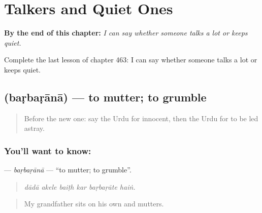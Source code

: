 
\chapter{Talkers and Quiet Ones}
\label{ch:ur-talkers-and-quiet-ones}

\begin{chapteropening}
\textbf{By the end of this chapter:} \emph{I can say whether someone talks a lot or keeps quiet.}

Complete the last lesson of chapter 463: I can say whether someone talks a lot or keeps quiet.
\end{chapteropening}

\section[\texorpdfstring{\ur{بڑبڑانا} (baṛbaṛānā)}{بڑبڑانا (baṛbaṛānā)}]{ (baṛbaṛānā) — to mutter; to grumble}

\label{lesson:UR-C463-barbarana}



\begin{quote}
Before the new one: say the Urdu for innocent, then the Urdu for to be led astray.
\end{quote}

\subsection*{You'll want to know: }
\textbf{} — \emph{baṛbaṛānā} — \textquotedblleft{}to mutter; to grumble\textquotedblright{}.

\begin{quote}
     
\end{quote}

\begin{quote}
\emph{dādā akele baiṭh kar baṛbaṛāte haiṅ.}
\end{quote}

\begin{quote}
My grandfather sits on his own and mutters.
\end{quote}


